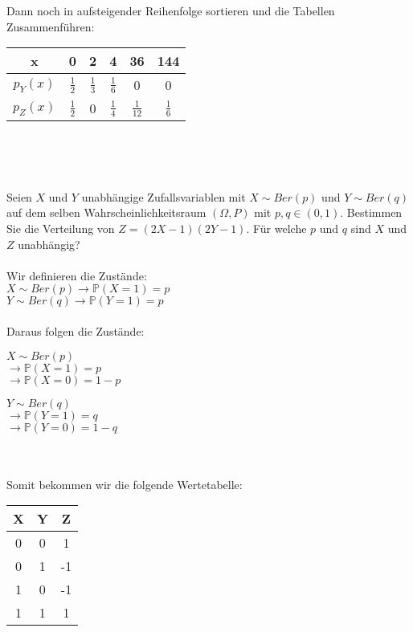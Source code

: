 \documentclass[a4paper]{article}
\begin{document}
Dann noch in aufsteigender Reihenfolge sortieren und die Tabellen Zusammenführen:\\
\begin{tabular}{c|c c c c c}
    x & 0 & 2 & 4 & 36 & 144 \\
    \hline
    $p_Y(x)$ & $\frac{1}{2}$ & $\frac{1}{3}$ & $\frac{1}{6}$ & 0 & 0\\
    $p_Z(x)$ & $\frac{1}{2}$ & 0 & $\frac{1}{4}$ & $\frac{1}{12}$ & $\frac{1}{6}$\\
\end{tabular}\\\\
\subsection{}
Seien $X$ und $Y$ unabhängige Zufallsvariablen mit $X \sim Ber(p)$ und $Y \sim Ber(q)$ auf dem selben Wahrscheinlichkeitsraum $(\Omega, P)$ mit $p, q \in (0, 1)$. Bestimmen Sie die Verteilung von $Z=(2X-1)(2Y-1)$. Für welche $p$ und $q$ sind $X$ und $Z$ unabhängig?\\\\
Wir definieren die Zustände:\\
$X \sim Ber(p) \to \mathbb{P}(X = 1) = p$\\
$Y \sim Ber(q) \to \mathbb{P}(Y = 1) = p$\\\\
Daraus folgen die Zustände:\\
\begin{minipage}[t]{0.45\textwidth}
    $X \sim Ber(p)$\\
    $\to \mathbb{P}(X = 1) = p$\\
    $\to \mathbb{P}(X = 0) = 1 - p$
\end{minipage}
\hfill
\begin{minipage}[t]{0.45\textwidth}
    $Y \sim Ber(q)$\\
    $\to \mathbb{P}(Y = 1) = q$\\
    $\to \mathbb{P}(Y = 0) = 1 - q$
\end{minipage}\\\\
Somit bekommen wir die folgende Wertetabelle:\\
\begin{tabular}{c|c|c}
    X & Y & Z\\
    \hline
    0 & 0 & 1\\
    0 & 1 & -1\\
    1 & 0 & -1\\
    1 & 1 & 1
\end{tabular}\\\\
\end{document}

